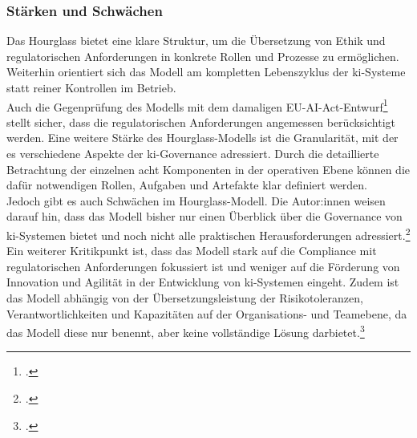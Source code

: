 \subsubsection{Stärken und Schwächen}
\label{subsubsec:hourglass_stärken_schwächen}
Das Hourglass bietet eine klare Struktur, um die Übersetzung von Ethik und regulatorischen Anforderungen in konkrete Rollen und Prozesse zu ermöglichen.
Weiterhin orientiert sich das Modell am kompletten Lebenszyklus der \ac{ki}-Systeme statt reiner Kontrollen im Betrieb.
\\
Auch die Gegenprüfung des Modells mit dem damaligen EU-AI-Act-Entwurf\footcite{ europeanparliamentaryresearchserviceArtificialIntelligenceAct2024} stellt sicher, dass die regulatorischen Anforderungen angemessen berücksichtigt werden.
Eine weitere Stärke des Hourglass-Modells ist die Granularität, mit der es verschiedene Aspekte der \ac{ki}-Governance adressiert.
Durch die detaillierte Betrachtung der einzelnen acht Komponenten in der operativen Ebene können die dafür notwendigen Rollen, Aufgaben und Artefakte klar definiert werden.
\\
Jedoch gibt es auch Schwächen im Hourglass-Modell.
Die Autor:innen weisen darauf hin, dass das Modell bisher nur einen Überblick über die Governance von \ac{ki}-Systemen bietet und noch nicht alle praktischen Herausforderungen adressiert.\footcite[13]{mantymakiPDFPuttingAI2025}
Ein weiterer Kritikpunkt ist, dass das Modell stark auf die Compliance mit regulatorischen Anforderungen fokussiert ist und weniger auf die Förderung von Innovation und Agilität in der Entwicklung von \ac{ki}-Systemen eingeht.
Zudem ist das Modell abhängig von der Übersetzungsleistung der Risikotoleranzen, Verantwortlichkeiten und Kapazitäten auf der Organisations- und Teamebene, da das Modell diese nur benennt, aber keine vollständige Lösung darbietet.\footcite[6-7;12]{mantymakiPDFPuttingAI2025}